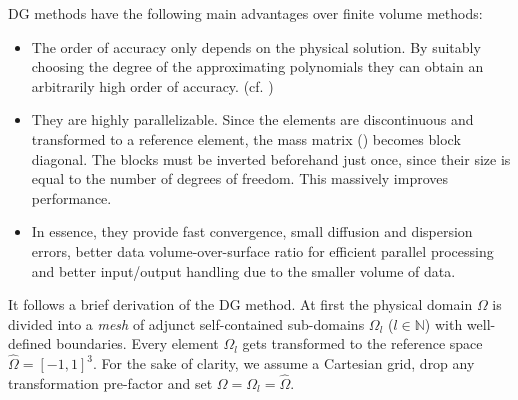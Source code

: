 DG methods have the following main advantages over finite volume methods:
\begin{itemize}
\item The order of accuracy only depends on the physical solution. By suitably
choosing the degree of the approximating polynomials they can obtain an
arbitrarily high order of accuracy. (cf. \cite{yu2013accuracy})

\item They are highly parallelizable. Since the elements are discontinuous and
transformed to a reference element, the mass matrix () becomes
block diagonal. The blocks must be inverted beforehand just once, since their
size is equal to the number of degrees of freedom. This massively improves
performance.



\item In essence, they provide fast convergence, small diffusion and dispersion
errors, better data volume-over-surface ratio for efficient parallel processing
and better input/output handling due to the smaller volume of data.
\end{itemize}


It follows a brief derivation of the DG method.  At first the physical domain
$\Omega$ is divided into a \emph{mesh} of adjunct self-contained sub-domains
$\Omega_l$ ($l \in \mathbb{N}$) with well-defined boundaries. Every
element $\Omega_l$ gets transformed to the reference space $\hat{\Omega} =
[-1,1]^3$. For the sake of clarity, we assume a Cartesian grid, drop any
transformation pre-factor and set $\Omega = \Omega_l = \hat{\Omega}$.

